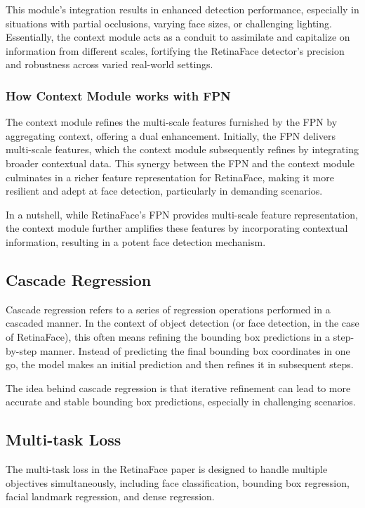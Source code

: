 \documentclass{article}
\begin{document}
This module's integration results in enhanced detection performance, especially in situations with partial occlusions, varying face sizes, or challenging lighting. Essentially, the context module acts as a conduit to assimilate and capitalize on information from different scales, fortifying the RetinaFace detector's precision and robustness across varied real-world settings.

\subsubsection{How Context Module works with FPN}

The context module refines the multi-scale features furnished by the FPN by aggregating context, offering a dual enhancement. Initially, the FPN delivers multi-scale features, which the context module subsequently refines by integrating broader contextual data. This synergy between the FPN and the context module culminates in a richer feature representation for RetinaFace, making it more resilient and adept at face detection, particularly in demanding scenarios.

In a nutshell, while RetinaFace's FPN provides multi-scale feature representation, the context module further amplifies these features by incorporating contextual information, resulting in a potent face detection mechanism.

\subsection{Cascade Regression}

Cascade regression refers to a series of regression operations performed in a cascaded manner. In the context of object detection (or face detection, in the case of RetinaFace), this often means refining the bounding box predictions in a step-by-step manner. Instead of predicting the final bounding box coordinates in one go, the model makes an initial prediction and then refines it in subsequent steps.

The idea behind cascade regression is that iterative refinement can lead to more accurate and stable bounding box predictions, especially in challenging scenarios.

\subsection{Multi-task Loss}

The multi-task loss in the RetinaFace paper is designed to handle multiple objectives simultaneously, including face classification, bounding box regression, facial landmark regression, and dense regression.
\end{document}

